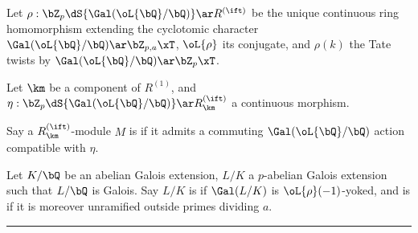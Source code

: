 \documentclass[article, a4paper, twoside]{universal}
\begin{document}
\begin{cmt}
	Let $\rho:\bZ_{p}\dS{\Gal(\oL{\bQ}/\bQ)}\ar R^{(\ift)}$ be the unique continuous ring homomorphism extending the cyclotomic character $\Gal(\oL{\bQ}/\bQ)\ar\bZ_{p,a}\xT$, $\oL{\rho}$ its conjugate, and $\rho(k)$ the Tate twists by $\Gal(\oL{\bQ}/\bQ)\ar\bZ_{p}\xT$.

	\begin{dfn}
		Let $\km$ be a component of $R^{(1)}$, and $\eta:\bZ_{p}\dS{\Gal(\oL{\bQ}/\bQ)}\ar R_{\km}^{(\ift)}$ a continuous morphism.

		Say a $R_{\km}^{(\ift)}$-module $M$ is  if it admits a commuting $\Gal(\oL{\bQ}/\bQ)$ action compatible with $\eta$.
	\end{dfn}

	\begin{dfn}
		Let $K/\bQ$ be an abelian Galois extension, $L/K$ a $p$-abelian Galois extension such that $L/\bQ$ is Galois. Say $L/K$ is  if $\Gal(L/K)$ is $\oL{\rho}(-1)$-yoked, and is  if it is moreover unramified outside primes dividing $a$.
	\end{dfn}
\end{cmt}

\hrule
\end{document}
